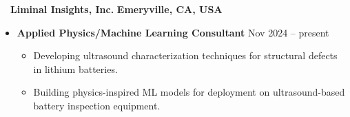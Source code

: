 ~~{\color{black}\textbf{Liminal Insights, Inc.} \hfill  \textbf{Emeryville, CA, USA}}\par
\begin{itemize}
    \item
        \textbf{Applied Physics/Machine Learning Consultant}
        \hfill  {Nov 2024 -- present} \par
        \begin{itemize}
            \item   Developing ultrasound characterization techniques for structural defects in lithium batteries. 
            \item   Building physics-inspired ML models for deployment on ultrasound-based battery inspection equipment. 
        \end{itemize}
\end{itemize}